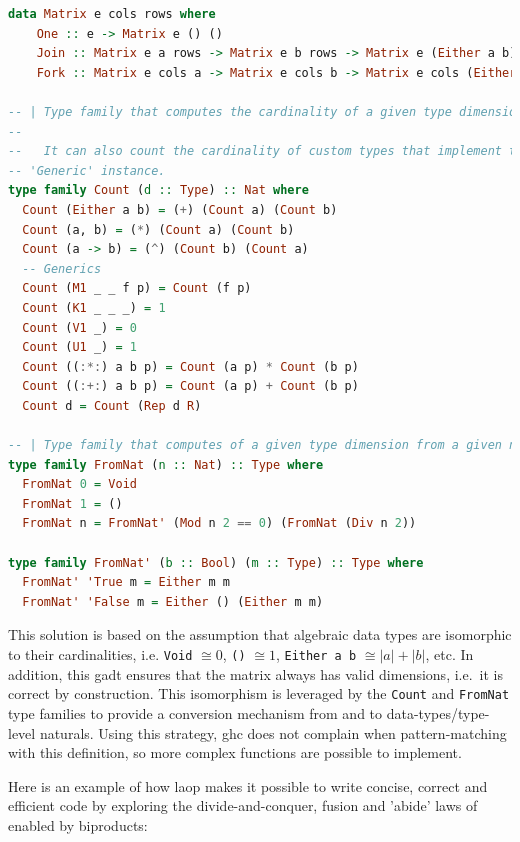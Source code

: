 \documentclass[
  oneside,
  11pt, a4paper,
  footinclude=true,
  headinclude=true,
  cleardoublepage=empty
]{scrbook}
\theoremstyle{definition}
\theoremstyle{definition}
\begin{document}
        \begin{lstlisting}[language=Haskell,label={lst:type-fam}, caption={Inductive Matrix definition},captionpos=b]
data Matrix e cols rows where
    One :: e -> Matrix e () ()
    Join :: Matrix e a rows -> Matrix e b rows -> Matrix e (Either a b) rows
    Fork :: Matrix e cols a -> Matrix e cols b -> Matrix e cols (Either a b)

-- | Type family that computes the cardinality of a given type dimension.
--
--   It can also count the cardinality of custom types that implement the
-- 'Generic' instance.
type family Count (d :: Type) :: Nat where
  Count (Either a b) = (+) (Count a) (Count b)
  Count (a, b) = (*) (Count a) (Count b)
  Count (a -> b) = (^) (Count b) (Count a)
  -- Generics
  Count (M1 _ _ f p) = Count (f p)
  Count (K1 _ _ _) = 1
  Count (V1 _) = 0
  Count (U1 _) = 1
  Count ((:*:) a b p) = Count (a p) * Count (b p)
  Count ((:+:) a b p) = Count (a p) + Count (b p)
  Count d = Count (Rep d R)

-- | Type family that computes of a given type dimension from a given natural
type family FromNat (n :: Nat) :: Type where
  FromNat 0 = Void
  FromNat 1 = ()
  FromNat n = FromNat' (Mod n 2 == 0) (FromNat (Div n 2))

type family FromNat' (b :: Bool) (m :: Type) :: Type where
  FromNat' 'True m = Either m m
  FromNat' 'False m = Either () (Either m m)
        \end{lstlisting}{}
	    
	    This solution is based on the assumption that algebraic data types are isomorphic to their cardinalities, i.e. \texttt{Void} $ \cong 0$, \texttt{()} $\cong 1$, \texttt{Either a b} $\cong |a| + |b|$, etc. In addition, this \gls{gadt} ensures that the matrix always has valid dimensions, i.e.\ it is correct by construction. This isomorphism is leveraged by the \texttt{Count} and \texttt{FromNat} type families to provide a conversion mechanism from and to data-types/type-level naturals. Using this strategy, \gls{ghc} does not complain when pattern-matching with this definition, so more complex functions are possible to implement.
	    
	    Here is an example of how \gls{laop} makes it possible to write concise, correct and efficient code by exploring the divide-and-conquer, fusion and 'abide' laws of enabled by biproducts:
	    
\end{document}

